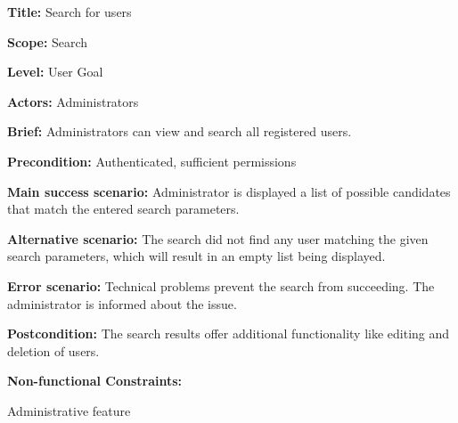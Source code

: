 
\begin{DoxyItemize}
\item {\bfseries{Title\+:}} Search for users
\item {\bfseries{Scope\+:}} Search
\item {\bfseries{Level\+:}} User Goal
\item {\bfseries{Actors\+:}} Administrators
\item {\bfseries{Brief\+:}} Administrators can view and search all registered users.
\end{DoxyItemize}


\begin{DoxyItemize}
\item {\bfseries{Precondition\+:}} Authenticated, sufficient permissions
\item {\bfseries{Main success scenario\+:}} Administrator is displayed a list of possible candidates that match the entered search parameters.
\item {\bfseries{Alternative scenario\+:}} The search did not find any user matching the given search parameters, which will result in an empty list being displayed.
\item {\bfseries{Error scenario\+:}} Technical problems prevent the search from succeeding. The administrator is informed about the issue.
\item {\bfseries{Postcondition\+:}} The search results offer additional functionality like editing and deletion of users.
\item {\bfseries{Non-\/functional Constraints\+:}}
\begin{DoxyItemize}
\item Administrative feature 
\end{DoxyItemize}
\end{DoxyItemize}